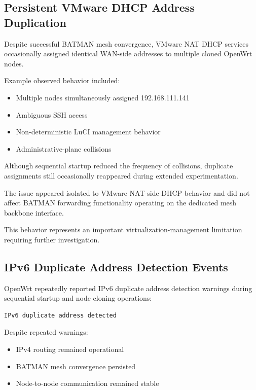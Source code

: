 \documentclass[conference]{IEEEtran}
\begin{document}
\subsection{Persistent VMware DHCP Address Duplication}

Despite successful BATMAN mesh convergence, VMware NAT DHCP services occasionally assigned identical WAN-side addresses to multiple cloned OpenWrt nodes.

Example observed behavior included:

\begin{itemize}
    \item Multiple nodes simultaneously assigned 192.168.111.141
    \item Ambiguous SSH access
    \item Non-deterministic LuCI management behavior
    \item Administrative-plane collisions
\end{itemize}

Although sequential startup reduced the frequency of collisions, duplicate assignments still occasionally reappeared during extended experimentation.

The issue appeared isolated to VMware NAT-side DHCP behavior and did not affect BATMAN forwarding functionality operating on the dedicated mesh backbone interface.

This behavior represents an important virtualization-management limitation requiring further investigation.

\subsection{IPv6 Duplicate Address Detection Events}

OpenWrt repeatedly reported IPv6 duplicate address detection warnings during sequential startup and node cloning operations:

\begin{verbatim}
IPv6 duplicate address detected
\end{verbatim}

Despite repeated warnings:

\begin{itemize}
    \item IPv4 routing remained operational
    \item BATMAN mesh convergence persisted
    \item Node-to-node communication remained stable
\end{itemize}
\end{document}
